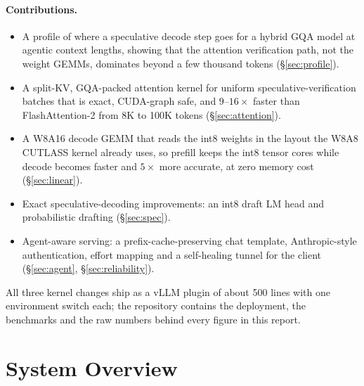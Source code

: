 \documentclass[acmtog,nonacm,screen]{acmart}
\begin{document}
\paragraph{Contributions.}
\begin{itemize}
\item A profile of where a speculative decode step goes for a hybrid GQA model at agentic context lengths, showing
that the attention verification path, not the weight GEMMs, dominates beyond a few thousand tokens (\S\ref{sec:profile}).
\item A split-KV, GQA-packed attention kernel for uniform speculative-verification batches that is exact,
CUDA-graph safe, and $9$--$16\times$ faster than FlashAttention-2 from 8K to 100K tokens (\S\ref{sec:attention}).
\item A W8A16 decode GEMM that reads the int8 weights in the layout the W8A8 CUTLASS kernel already uses, so prefill
keeps the int8 tensor cores while decode becomes faster and $5\times$ more accurate, at zero memory cost
(\S\ref{sec:linear}).
\item Exact speculative-decoding improvements: an int8 draft LM head and probabilistic drafting (\S\ref{sec:spec}).
\item Agent-aware serving: a prefix-cache-preserving chat template, Anthropic-style authentication, effort mapping
and a self-healing tunnel for the client (\S\ref{sec:agent}, \S\ref{sec:reliability}).
\end{itemize}
All three kernel changes ship as a vLLM plugin of about 500 lines with one environment switch each; the repository contains the
deployment, the benchmarks and the raw numbers behind every figure in this report.

\section{System Overview}
\label{sec:system}
\end{document}
